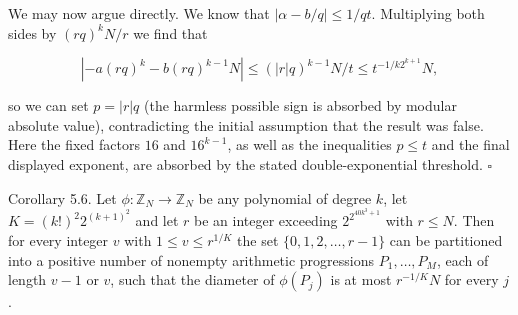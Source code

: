 \documentclass[10pt]{article}
\begin{document}
We may now argue directly. We know that $|\alpha-b / q| \leqslant 1 / q t$. Multiplying both sides by $(r q)^{k} N / r$ we find that

$$
\left|-a(r q)^{k}-b(r q)^{k-1} N\right| \leqslant(|r| q)^{k-1} N / t \leqslant t^{-1 / k 2^{k+1}} N,
$$

so we can set $p=|r| q$ (the harmless possible sign is absorbed by modular
absolute value), contradicting the initial assumption that the result was
false.  Here the fixed factors $16$ and $16^{k-1}$, as well as the inequalities
$p\leqslant t$ and the final displayed exponent, are absorbed by the stated
double-exponential threshold. \(\square\)


Corollary 5.6. Let $\phi: \mathbb{Z}_{N} \rightarrow \mathbb{Z}_{N}$ be any polynomial of degree $k$, let $K=(k!)^{2} 2^{(k+1)^{2}}$ and let $r$ be an integer exceeding $2^{2^{40 k^{3}+1}}$ with $r\leqslant N$. Then for every integer $v$ with $1 \leqslant v \leqslant r^{1 / K}$ the set $\{0,1,2, \ldots, r-1\}$ can be partitioned into a positive number of nonempty arithmetic progressions $P_{1}, \ldots, P_{M}$, each of length $v-1$ or $v$, such that the diameter of $\phi\left(P_{j}\right)$ is at most $r^{-1 / K} N$ for every $j$.
\end{document}
